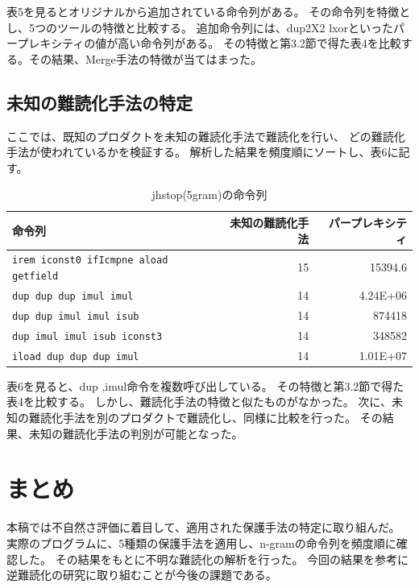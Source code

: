 \documentclass[a4j,fleqn,10pt]{jarticle}
\begin{document}
表5を見るとオリジナルから追加されている命令列がある。
その命令列を特徴とし、5つのツールの特徴と比較する。
追加命令列には、dup2X2 lxorといったパープレキシティの値が高い命令列がある。
その特徴と第3.2節で得た表4を比較する。その結果、Merge手法の特徴が当てはまった。

\subsection{未知の難読化手法の特定}
ここでは、既知のプロダクトを未知の難読化手法で難読化を行い、
どの難読化手法が使われているかを検証する。
解析した結果を頻度順にソートし、表6に記す。

\begin{table}[t]
  \centering
  \footnotesize{
    \caption{jhstop(5gram)の命令列}\label{table:jhstop}
  \begin{tabular}{lrr}
    命令列 &
    \multicolumn{1}{p{1cm}}{未知の難読化手法} & 
    \multicolumn{1}{p{1cm}}{パープレキシティ} \\ \hline
    \texttt{irem iconst0 ifIcmpne aload getfield}     & 15 & 15394.6 \\
    \texttt{dup dup dup imul imul}                    & 14 & 4.24E+06 \\
    \texttt{dup dup imul imul isub}                   & 14 & 874418 \\
    \texttt{dup imul imul isub iconst3}               & 14 & 348582 \\
    \texttt{iload dup dup dup imul}                   & 14 & 1.01E+07 \\
    \end{tabular}}
\end{table}

表6を見ると、dup ,imul命令を複数呼び出している。
その特徴と第3.2節で得た表4を比較する。
しかし、難読化手法の特徴と似たものがなかった。
 次に、未知の難読化手法を別のプロダクトで難読化し、同様に比較を行った。
 その結果、未知の難読化手法の判別が可能となった。
 
 \section{まとめ}
本稿では不自然さ評価に着目して、適用された保護手法の特定に取り組んだ。
実際のプログラムに、5種類の保護手法を適用し、n-gramの命令列を頻度順に確認した。
その結果をもとに不明な難読化の解析を行った。
今回の結果を参考に逆難読化の研究に取り組むことが今後の課題である。




\end{document}
